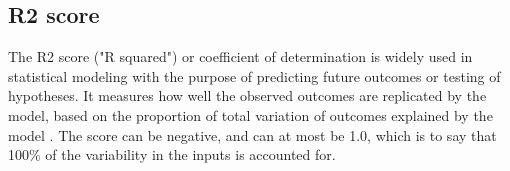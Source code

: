 
\subsection{R2 score}
The R2 score ("R squared") or coefficient of determination is widely used
in statistical modeling with the purpose of predicting future outcomes or
testing of hypotheses. It measures how well the observed outcomes are
replicated by the model, based on the proportion of total variation of outcomes
explained by the model \cite{Heinisch1962}. The score can be negative, and can
at most be 1.0, which is to say that 100\% of the variability in the inputs
is accounted for.

